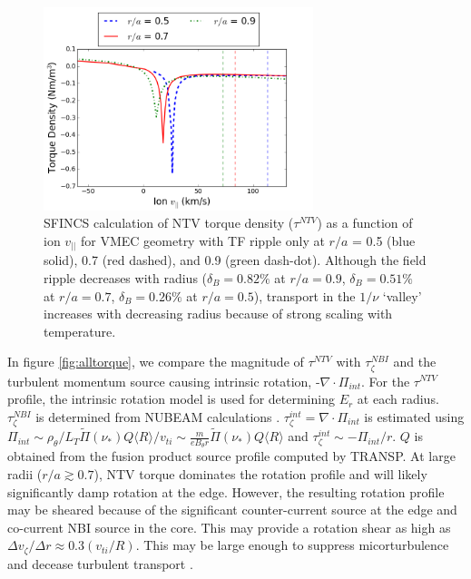 \documentclass{article}
\begin{document}
\begin{figure}[h!]
\centering
\includegraphics[width=0.7\textwidth]
{Torque_radiusscaling.png}
\caption{\label{fig:Torque_radiusscaling} SFINCS calculation of NTV torque density ($\tau^{NTV}$) as a function of ion $v_{||}$ for VMEC geometry with TF ripple only at $r/a$ = 0.5 (blue solid), 0.7 (red dashed), and 0.9 (green dash-dot). Although the field ripple decreases with radius ($\delta_B = 0.82\%$ at $r/a = 0.9$, $\delta_B = 0.51\%$ at $r/a = 0.7$, $\delta_B = 0.26\%$ at $r/a = 0.5$), transport in the $1/\nu$ `valley' increases with decreasing radius because of strong scaling with temperature. }
\end{figure}

In figure \ref{fig:alltorque}, we compare the magnitude of $\tau^{NTV}$ with $\tau_{\zeta}^{NBI}$ and the turbulent momentum source causing intrinsic rotation, -$\nabla \cdot \Pi_{int}$. For the $\tau^{NTV}$ profile, the intrinsic rotation model is used for determining $E_r$ at each radius. $\tau_{\zeta}^{NBI}$ is determined from NUBEAM calculations \cite{Poli2014}. $\tau_{\zeta}^{int} = \nabla \cdot \Pi_{int}$ is estimated using $\Pi_{int} \sim \rho_{\theta}/L_T \widetilde{\Pi}(\nu_*) Q \langle R \rangle/v_{ti} \sim \frac{m}{eB_{\theta}r} \widetilde{\Pi}(\nu_*) Q \langle R \rangle$ and $\tau_{\zeta}^{int} \sim -\Pi_{int}/r$. $Q$ is obtained from the fusion product source profile computed by TRANSP. 
At large radii ($r/a \gtrsim 0.7$), NTV torque dominates the rotation profile and will likely significantly damp rotation at the edge. However, the resulting rotation profile may be sheared because of the significant counter-current source at the edge and co-current NBI source in the core. This may provide a rotation shear as high as $\Delta v_{\zeta}/ \Delta r \approx 0.3 (v_{ti}/R)$. This may be large enough to suppress micorturbulence and decease turbulent transport \cite{Hahm1994}. 
\end{document}
